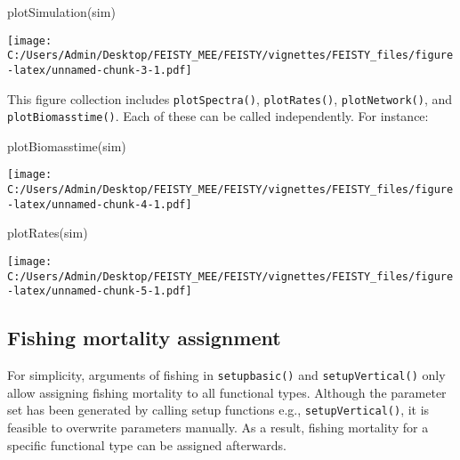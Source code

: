 \documentclass[
]{article}
\newenvironment{Shaded}{\begin{snugshade}}{\end{snugshade}}
\newcommand{\FunctionTok}[1]{\textcolor[rgb]{0.00,0.00,0.00}{#1}}
\newcommand{\NormalTok}[1]{#1}
\begin{document}
\begin{Shaded}
\begin{Highlighting}[]
\FunctionTok{plotSimulation}\NormalTok{(sim)}
\end{Highlighting}
\end{Shaded}

\texttt{[image: C:/Users/Admin/Desktop/FEISTY\_MEE/FEISTY/vignettes/FEISTY\_files/figure-latex/unnamed-chunk-3-1.pdf]}

This figure collection includes \texttt{plotSpectra()},
\texttt{plotRates()}, \texttt{plotNetwork()}, and
\texttt{plotBiomasstime()}. Each of these can be called independently.
For instance:

\begin{Shaded}
\begin{Highlighting}[]
\FunctionTok{plotBiomasstime}\NormalTok{(sim)}
\end{Highlighting}
\end{Shaded}

\texttt{[image: C:/Users/Admin/Desktop/FEISTY\_MEE/FEISTY/vignettes/FEISTY\_files/figure-latex/unnamed-chunk-4-1.pdf]}

\begin{Shaded}
\begin{Highlighting}[]
\FunctionTok{plotRates}\NormalTok{(sim)}
\end{Highlighting}
\end{Shaded}

\texttt{[image: C:/Users/Admin/Desktop/FEISTY\_MEE/FEISTY/vignettes/FEISTY\_files/figure-latex/unnamed-chunk-5-1.pdf]}

\hypertarget{fishing-mortality-assignment}{%
\subsection{Fishing mortality
assignment}\label{fishing-mortality-assignment}}

For simplicity, arguments of fishing in \texttt{setupbasic()} and
\texttt{setupVertical()} only allow assigning fishing mortality to all
functional types. Although the parameter set has been generated by
calling setup functions e.g., \texttt{setupVertical()}, it is feasible
to overwrite parameters manually. As a result, fishing mortality for a
specific functional type can be assigned afterwards.
\end{document}
